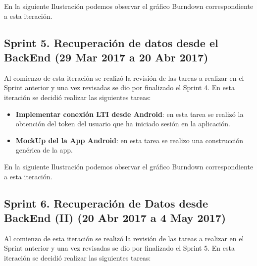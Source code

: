 En la siguiente Ilustración podemos observar el gráfico Burndown correspondiente a esta iteración.

\subsection{Sprint 5. Recuperación de datos desde el BackEnd (29 Mar 2017 a 20 Abr 2017)}

Al comienzo de esta iteración se realizó la revisión de las tareas a realizar en el Sprint anterior y una vez revisadas se dio por finalizado el Sprint 4. 
En esta iteración se decidió realizar las siguientes tareas:

\begin{itemize}

	\item \textbf{Implementar conexión LTI desde Android}: en esta tarea se realizó la obtención del token del usuario que ha iniciado sesión en la aplicación.
	\item \textbf{MockUp del la App Android}: en esta tarea se realizo una construcción genérica de la app.


\end{itemize}

En la siguiente Ilustración podemos observar el gráfico Burndown correspondiente a esta iteración.

\subsection{Sprint 6. Recuperación de Datos desde BackEnd (II) (20 Abr 2017 a 4 May 2017)}

Al comienzo de esta iteración se realizó la revisión de las tareas a realizar en el Sprint anterior y una vez revisadas se dio por finalizado el Sprint 5. 
En esta iteración se decidió realizar las siguientes tareas:

